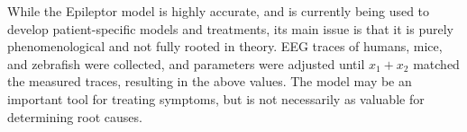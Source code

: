 While the Epileptor model is highly accurate, and is currently being used to develop patient-specific models and treatments, its main issue is that it is purely phenomenological and not fully rooted in theory.
EEG traces of humans, mice, and zebrafish were collected, and parameters were adjusted until $x_{1} + x_{2}$ matched the measured traces, resulting in the above values.
The model may be an important tool for treating symptoms, but is not necessarily as valuable for determining root causes.

